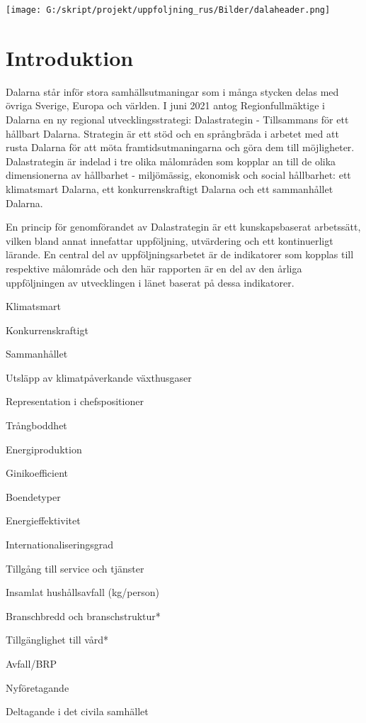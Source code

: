 \documentclass[
]{article}
\author{}
\date{\vspace{-2.5em}}
\begin{document}
\texttt{[image: G:/skript/projekt/uppfoljning\_rus/Bilder/dalaheader.png]}

\hypertarget{introduktion}{%
\section{Introduktion}\label{introduktion}}

Dalarna står inför stora samhällsutmaningar som i många stycken delas
med övriga Sverige, Europa och världen. I juni 2021 antog
Regionfullmäktige i Dalarna en ny regional utvecklingsstrategi:
Dalastrategin - Tillsammans för ett hållbart Dalarna. Strategin är ett
stöd och en språngbräda i arbetet med att rusta Dalarna för att möta
framtidsutmaningarna och göra dem till möjligheter. Dalastrategin är
indelad i tre olika målområden som kopplar an till de olika
dimensionerna av hållbarhet - miljömässig, ekonomisk och social
hållbarhet: ett klimatsmart Dalarna, ett konkurrenskraftigt Dalarna och
ett sammanhållet Dalarna.

En princip för genomförandet av Dalastrategin är ett kunskapsbaserat
arbetssätt, vilken bland annat innefattar uppföljning, utvärdering och
ett kontinuerligt lärande. En central del av uppföljningsarbetet är de
indikatorer som kopplas till respektive målområde och den här rapporten
är en del av den årliga uppföljningen av utvecklingen i länet baserat på
dessa indikatorer.

Klimatsmart

Konkurrenskraftigt

Sammanhållet

{Utsläpp av klimatpåverkande växthusgaser }

{Representation i chefspositioner }

{Trångboddhet }

{Energiproduktion }

{Ginikoefficient }

{Boendetyper }

{Energieffektivitet }

{Internationaliseringsgrad }

{Tillgång till service och tjänster }

{Insamlat hushållsavfall (kg/person) }

{Branschbredd och branschstruktur* }

{Tillgänglighet till vård* }

{Avfall/BRP }

{Nyföretagande }

{Deltagande i det civila samhället }
\end{document}

